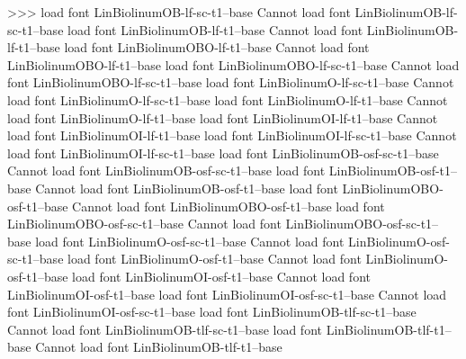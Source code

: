{{{{{{{>>>
load font	LinBiolinumOB-lf-sc-t1--base
Cannot load font LinBiolinumOB-lf-sc-t1--base
load font	LinBiolinumOB-lf-t1--base
Cannot load font LinBiolinumOB-lf-t1--base
load font	LinBiolinumOBO-lf-t1--base
Cannot load font LinBiolinumOBO-lf-t1--base
load font	LinBiolinumOBO-lf-sc-t1--base
Cannot load font LinBiolinumOBO-lf-sc-t1--base
load font	LinBiolinumO-lf-sc-t1--base
Cannot load font LinBiolinumO-lf-sc-t1--base
load font	LinBiolinumO-lf-t1--base
Cannot load font LinBiolinumO-lf-t1--base
load font	LinBiolinumOI-lf-t1--base
Cannot load font LinBiolinumOI-lf-t1--base
load font	LinBiolinumOI-lf-sc-t1--base
Cannot load font LinBiolinumOI-lf-sc-t1--base
load font	LinBiolinumOB-osf-sc-t1--base
Cannot load font LinBiolinumOB-osf-sc-t1--base
load font	LinBiolinumOB-osf-t1--base
Cannot load font LinBiolinumOB-osf-t1--base
load font	LinBiolinumOBO-osf-t1--base
Cannot load font LinBiolinumOBO-osf-t1--base
load font	LinBiolinumOBO-osf-sc-t1--base
Cannot load font LinBiolinumOBO-osf-sc-t1--base
load font	LinBiolinumO-osf-sc-t1--base
Cannot load font LinBiolinumO-osf-sc-t1--base
load font	LinBiolinumO-osf-t1--base
Cannot load font LinBiolinumO-osf-t1--base
load font	LinBiolinumOI-osf-t1--base
Cannot load font LinBiolinumOI-osf-t1--base
load font	LinBiolinumOI-osf-sc-t1--base
Cannot load font LinBiolinumOI-osf-sc-t1--base
load font	LinBiolinumOB-tlf-sc-t1--base
Cannot load font LinBiolinumOB-tlf-sc-t1--base
load font	LinBiolinumOB-tlf-t1--base
Cannot load font LinBiolinumOB-tlf-t1--base
}}}}}}}
